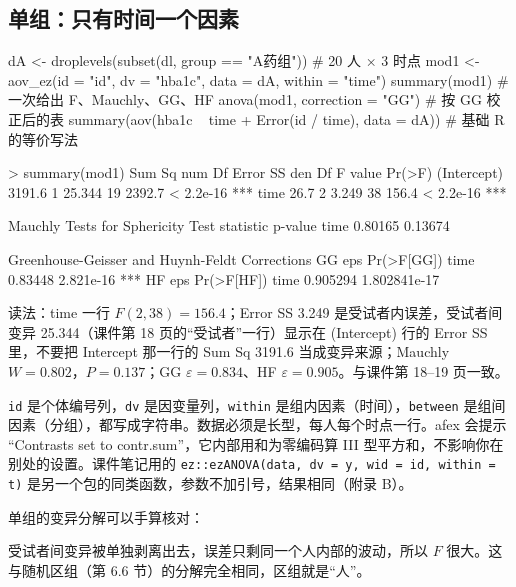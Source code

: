 \subsection{单组：只有时间一个因素}
\begin{RCode}[R · aov\_ez 单组]
dA <- droplevels(subset(dl, group == "A药组"))     # 20 人 × 3 时点
mod1 <- aov_ez(id = "id", dv = "hba1c", data = dA, within = "time")
summary(mod1)                                      # 一次给出 F、Mauchly、GG、HF
anova(mod1, correction = "GG")                     # 按 GG 校正后的表
summary(aov(hba1c ~ time + Error(id / time), data = dA))   # 基础 R 的等价写法
\end{RCode}
\begin{ROut}
> summary(mod1)
            Sum Sq num Df Error SS den Df F value    Pr(>F)
(Intercept) 3191.6      1   25.344     19  2392.7 < 2.2e-16 ***
time          26.7      2    3.249     38   156.4 < 2.2e-16 ***

Mauchly Tests for Sphericity
     Test statistic p-value
time        0.80165 0.13674

Greenhouse-Geisser and Huynh-Feldt Corrections
      GG eps Pr(>F[GG])
time 0.83448  2.821e-16 ***
       HF eps   Pr(>F[HF])
time 0.905294 1.802841e-17
\end{ROut}
读法：time 一行 $F(2,38)=156.4$；Error SS 3.249 是受试者内误差，受试者间变异 25.344（课件第 18 页的“受试者”一行）显示在 (Intercept) 行的 Error SS 里，不要把 Intercept 那一行的 Sum Sq 3191.6 当成变异来源；Mauchly $W=0.802$，$P=0.137$；GG $\varepsilon=0.834$、HF $\varepsilon=0.905$。与课件第 18–19 页一致。

\begin{notebox}
\Verb|id| 是个体编号列，\Verb|dv| 是因变量列，\Verb|within| 是组内因素（时间），\Verb|between| 是组间因素（分组），都写成字符串。数据必须是长型，每人每个时点一行。afex 会提示 “Contrasts set to contr.sum”，它内部用和为零编码算 III 型平方和，不影响你在别处的设置。课件笔记用的 \Verb|ez::ezANOVA(data, dv = y, wid = id, within = t)| 是另一个包的同类函数，参数不加引号，结果相同（附录 B）。
\end{notebox}

单组的变异分解可以手算核对：

受试者间变异被单独剥离出去，误差只剩同一个人内部的波动，所以 $F$ 很大。这与随机区组（第 6.6 节）的分解完全相同，区组就是“人”。

